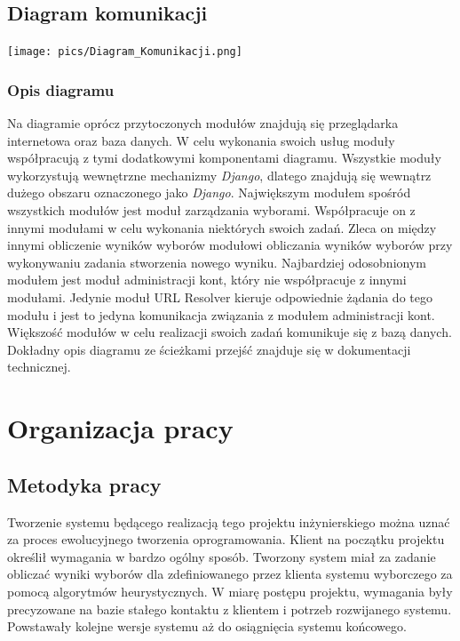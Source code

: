 \documentclass[polish,11pt]{aghthesis}
\begin{document}
\subsection{Diagram komunikacji}
\begin{center}
\centerline{\texttt{[image: pics/Diagram\_Komunikacji.png]}}
\end{center}

\subsubsection{Opis diagramu}
Na diagramie oprócz przytoczonych modułów znajdują się przeglądarka internetowa oraz
baza danych. W celu wykonania swoich usług moduły współpracują z tymi dodatkowymi
komponentami diagramu. Wszystkie moduły wykorzystują wewnętrzne mechanizmy \textit{Django},
dlatego znajdują się wewnątrz dużego obszaru oznaczonego jako \textit{Django}. Największym
modułem spośród wszystkich modułów jest moduł zarządzania wyborami. Współpracuje on
z innymi modułami w celu wykonania niektórych swoich zadań. Zleca on między innymi
obliczenie wyników wyborów modułowi obliczania wyników wyborów przy wykonywaniu
zadania stworzenia nowego wyniku. Najbardziej odosobnionym modułem jest moduł
administracji kont, który nie współpracuje z innymi modułami. Jedynie moduł URL Resolver
kieruje odpowiednie żądania do tego modułu i jest to jedyna komunikacja związania z
modułem administracji kont. Większość modułów w celu realizacji swoich zadań komunikuje
się z bazą danych. Dokładny opis diagramu ze ścieżkami przejść znajduje się w dokumentacji
technicznej.

\section{Organizacja pracy}
\subsection{Metodyka pracy}
Tworzenie systemu będącego realizacją tego projektu inżynierskiego można uznać za
proces ewolucyjnego tworzenia oprogramowania. Klient na początku projektu określił
wymagania w bardzo ogólny sposób. Tworzony system miał za zadanie obliczać wyniki
wyborów dla zdefiniowanego przez klienta systemu wyborczego za pomocą algorytmów
heurystycznych. W miarę postępu projektu, wymagania były precyzowane na bazie stałego
kontaktu z klientem i potrzeb rozwijanego systemu. Powstawały kolejne wersje systemu aż
do osiągnięcia systemu końcowego.
\end{document}
